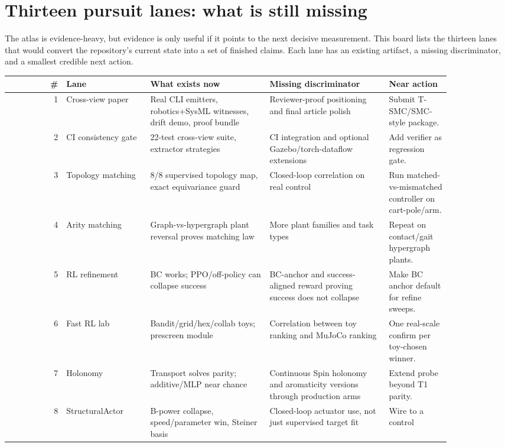 \documentclass[10pt]{article}
\begin{document}
\section{Thirteen pursuit lanes: what is still missing}

The atlas is evidence-heavy, but evidence is only useful if it points to the
next decisive measurement. This board lists the thirteen lanes that would
convert the repository's current state into a set of finished claims. Each lane
has an existing artifact, a missing discriminator, and a smallest credible next
action.

\begin{table}[!htbp]\centering\scriptsize
\begin{tabular}{rp{0.19\linewidth}p{0.27\linewidth}p{0.27\linewidth}p{0.14\linewidth}}
\toprule
\# & Lane & What exists now & Missing discriminator & Near action \\
\midrule
1 & Cross-view paper & Real CLI emitters, robotics+SysML witnesses, drift demo,
proof bundle & Reviewer-proof positioning and final article polish & Submit
T-SMC/SMC-style package. \\
2 & CI consistency gate & 22-test cross-view suite, extractor strategies & CI
integration and optional Gazebo/torch-dataflow extensions & Add verifier as
regression gate. \\
3 & Topology matching & 8/8 supervised topology map, exact equivariance guard &
Closed-loop correlation on real control & Run matched-vs-mismatched controller
on cart-pole/arm. \\
4 & Arity matching & Graph-vs-hypergraph plant reversal proves matching law &
More plant families and task types & Repeat on contact/gait hypergraph plants. \\
5 & RL refinement & BC works; PPO/off-policy can collapse success & BC-anchor
and success-aligned reward proving success does not collapse & Make BC anchor
default for refine sweeps. \\
6 & Fast RL lab & Bandit/grid/hex/collab toys; prescreen module & Correlation
between toy ranking and MuJoCo ranking & One real-scale confirm per toy-chosen
winner. \\
7 & Holonomy & Transport solves parity; additive/MLP near chance & Continuous
Spin holonomy and aromaticity versions through production arms & Extend probe
beyond T1 parity. \\
8 & StructuralActor & B-power collapse, speed/parameter win, Steiner basis &
Closed-loop actuator use, not just supervised target fit & Wire to a control

\end{tabular}
\end{table}
\end{document}
